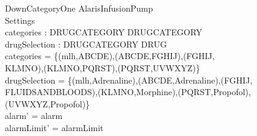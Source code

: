 \begin{schema}{DownCategoryOne}
	\Delta AlarisInfusionPump\\
	 Settings\\
	categories : DRUGCATEGORY \rel DRUGCATEGORY\\
	drugSelection : DRUGCATEGORY \rel DRUG\\
	\where
	categories = \{(mlh,ABCDE),(ABCDE,FGHIJ),(FGHIJ,\\
	KLMNO),(KLMNO,PQRST),(PQRST,UVWXYZ)\}\\
	drugSelection = \{(mlh,Adrenaline),(ABCDE,Adrenaline),(FGHIJ,\\
	FLUIDSANDBLOODS),(KLMNO,Morphine),(PQRST,Propofol),\\
	(UVWXYZ,Propofol)\}\\
	alarm' = alarm\\
	alarmLimit' = alarmLimit\\
	

\end{schema}
